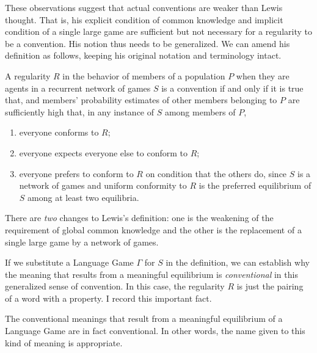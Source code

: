 
These observations suggest that actual conventions are weaker than Lewis thought. That is, his explicit condition of common knowledge and implicit condition of a single large game are sufficient but not necessary for a regularity to be a convention. His notion thus needs to be generalized. We can amend his definition as follows, keeping his original notation and terminology intact.

\begin{definition}

A regularity $R$ in the behavior of members of a population $P$ when they are agents in a recurrent network of games $S$ is a convention if and only if it is true that, and members' probability estimates of other members belonging to $P$ are sufficiently high that, in any instance of $S$ among members of $P$,

\begin{enumerate}

\item everyone conforms to $R$;

\item everyone expects everyone else to conform to $R$;

\item everyone prefers to conform to $R$ on condition that the others do, since $S$ is a network of games and uniform conformity to $R$ is the preferred equilibrium of $S$ among at least two equilibria.

\end{enumerate}

\end{definition}

There are \emph{two} changes to Lewis's definition: one is the weakening of the requirement of global common knowledge and the other is the replacement of a single large game by a network of games. 


If we substitute a Language Game $\Gamma$ for $S$ in the definition, we can establish why the meaning that results from a meaningful equilibrium is \emph{conventional} in this generalized sense of convention. In this case, the regularity $R$ is just the pairing of a word with a property. I record this important fact.
\begin{theorem}

The conventional meanings that result from a meaningful equilibrium of a Language Game are in fact conventional. In other words, the name given to this kind of meaning is appropriate.

\end{theorem}

